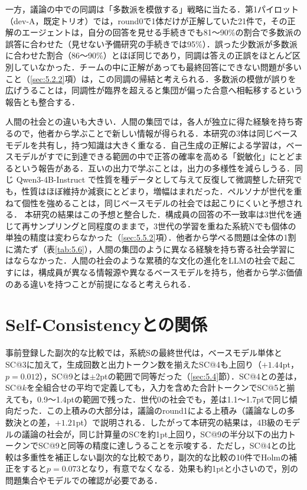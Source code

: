 一方，議論の中での同調は「多数派を模倣する」戦略に当たる．第1パイロット（dev-A，既定トリオ）では，round0で1体だけが正解していた21件で，その正解のエージェントは，自分の回答を見せる手続きでも81〜90\%の割合で多数派の誤答に合わせた（見せない予備研究の手続きでは95\%）．誤った少数派が多数派に合わせた割合（86〜90\%）とほぼ同じであり，同調は答えの正誤をほとんど区別していなかった．チームの中に正解があっても最終回答にできない問題が多いこと（\ref{sec:5.2.2}項）は，この同調の帰結と考えられる．多数派の模倣が誤りを広げうることは，同調性が臨界を超えると集団が偏った合意へ相転移するという報告\cite{okawa2026biased}とも整合する．

人間の社会との違いも大きい．人間の集団では，各人が独立に得た経験を持ち寄るので，他者から学ぶことで新しい情報が得られる．本研究の3体は同じベースモデルを共有し，持つ知識は大きく重なる．自己生成の正解による学習は，ベースモデルがすでに到達できる範囲の中で正答の確率を高める「鋭敏化」にとどまるという報告がある\cite{yue2025rlvr}．互いの出力で学ぶことは，出力の多様性を減らしうる\cite{shumailov2024collapse,wu2025reversal}．同じ Qwen3-4B-Instruct で性質を種データとして与えて反復して微調整した研究でも，性質はほぼ維持か減衰にとどまり，増幅はまれだった\cite{roe2026idempotent}．ペルソナが世代を重ねて個性を強めることは，同じベースモデルの社会では起こりにくいと予想される．
本研究の結果はこの予想と整合した．構成員の回答の不一致率は3世代を通じて再サンプリングと同程度のままで，3世代の学習を重ねた系統Nでも個体の単独の精度は変わらなかった（\ref{sec:5.5.2}項）．他者から学べる問題は全体の1割に満たず（表\ref{tab:5.6}），人間の集団のように異なる経験を持ち寄る社会学習にはならなかった．人間の社会のような累積的な文化の進化をLLMの社会で起こすには，構成員が異なる情報源や異なるベースモデルを持ち，他者から学ぶ価値のある違いを持つことが前提になると考えられる．

\section{Self-Consistencyとの関係}
\label{sec:6.3}

事前登録した副次的な比較では，系統Sの最終世代は，ベースモデル単体とSC@3に加えて，生成回数と出力トークン数を揃えたSC@4も上回り（$+1.44$pt，$p = 0.012$），SC@9とは$\pm 2$ptの範囲で同等だった（\ref{sec:5.4}節）．SC@4との差は，SC@$k$を全組合せの平均で定義しても，入力を含めた合計トークンでSC@5と揃えても，0.9〜1.4ptの範囲で残った．世代0の社会でも，差は1.1〜1.7ptで同じ傾向だった．この上積みの大部分は，議論のround1による上積み（議論なしの多数決との差，$+1.21$pt）で説明される．したがって本研究の結果は，4B級のモデルの議論の社会が，同じ計算量のSCを約1pt上回り，SC@9の半分以下の出力トークンでSC@9と同等の精度に達しうることを示唆する．ただし，SC@4との比較は多重性を補正しない副次的な比較であり，副次的な比較の10件でHolmの補正をすると$p = 0.073$となり，有意でなくなる．効果も約1ptと小さいので，別の問題集合やモデルでの確認が必要である．

